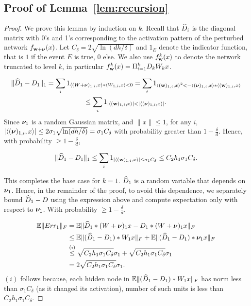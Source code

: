 \documentclass{article}
\begin{document}
\subsection{Proof of Lemma~\ref{lem:recursion}}
\begin{proof}
We prove this lemma by induction on $k$. Recall that $\widehat{D}_i$ is the diagonal matrix with 0's and 1's corresponding to the activation pattern of the perturbed network $f_{\mathbf{w}+\boldsymbol{\nu}}(x)$. Let $C_\delta=2\sqrt{\ln(dh/\delta)}$ and  $1_{E}$ denote the indicator function, that is $1$ if the event $E$ is true, $0$ else. We also use $f_{\mathbf{w}}^k(x)$ to denote the network truncated to level $k$, in particular $f_{\mathbf{w}}^k(x) =\Pi_{i=1}^k D_k W_k x$.


\begin{multline*}
\|\widehat{D}_1 - D_1\|_1 = \sum_i 1_{\left\langle (W+\boldsymbol{\nu})_{1,i}, x \right\rangle*\left\langle W_{1,i}, x \right\rangle <0} =\sum_i 1_{\left\langle (\mathbf{w})_{1,i}, x \right\rangle^2 < -\left\langle (\boldsymbol{\nu})_{1,i}, x \right\rangle*\left\langle (\mathbf{w})_{1,i}, x \right\rangle} \\ \leq \sum_i 1_{\left\lvert{\left\langle (\mathbf{w})_{1,i}, x \right\rangle}\right\rvert < \left\lvert{\left\langle (\boldsymbol{\nu})_{1,i}, x \right\rangle}\right\rvert}.
\end{multline*}
Since $\boldsymbol{\nu}_1$ is a random Gaussian matrix, and $\|x\| \leq 1$, for any $i$, $\left\lvert{\left\langle (\boldsymbol{\nu})_{1,i}, x \right\rangle}\right\rvert \leq 2\sigma_1\sqrt{\ln(dh/\delta)}=\sigma_1C_\delta$ with probability greater than $1-\frac{\delta}{d}$. Hence, with probability $\geq 1-\frac{\delta}{d}$,

\begin{align*}
\|\widehat{D}_1 - D_1\|_1 \leq \sum_i 1_{\left\lvert{\left\langle (\mathbf{w})_{1,i}, x \right\rangle}\right\rvert \leq \sigma_1C_\delta}  \leq C_2 h_1\sigma_1C_\delta.
\end{align*}

This completes the base case for $k=1$. $\widehat{D}_1$ is a random variable that depends on $\boldsymbol{\nu}_1$. Hence, in the remainder of the proof, to avoid this dependence, we separately bound $\widehat{D}_1 -D$ using the expression above and compute expectation only with respect to $\boldsymbol{\nu}_1$. With probability $\geq 1-\frac{\delta}{d}$,

\begin{align*}
\mathbb{E} \| Err_1 \|_F &= \mathbb{E} \|\widehat{D}_1*(W+\boldsymbol{\nu})_1 x - D_1*(W+\boldsymbol{\nu})_1 x \|_F \\
&\leq \mathbb{E} \|(\widehat{D}_1- D_1)*W_1 x \|_F + \mathbb{E} \|(\widehat{D}_1- D_1)*\boldsymbol{\nu}_1 x \|_F \\
& \stackrel{(i)}{\leq} \sqrt{C_2 h_1\sigma_1C_\delta} \sigma_1 + \sqrt{C_2 h_1\sigma_1C_\delta} \sigma_1\\
& = 2 \sqrt{C_2 h_1\sigma_1C_\delta} \sigma_1.
\end{align*}
$(i)$ follows because, each hidden node in  $\mathbb{E} \|(\widehat{D}_1- D_1)*W_1 x \|_F$ has norm less than $\sigma_1 C_{\delta}$ (as it changed its activation), number of such units is less than $C_2 h_1 \sigma_1 C_{\delta}$.


\end{proof}
\end{document}
